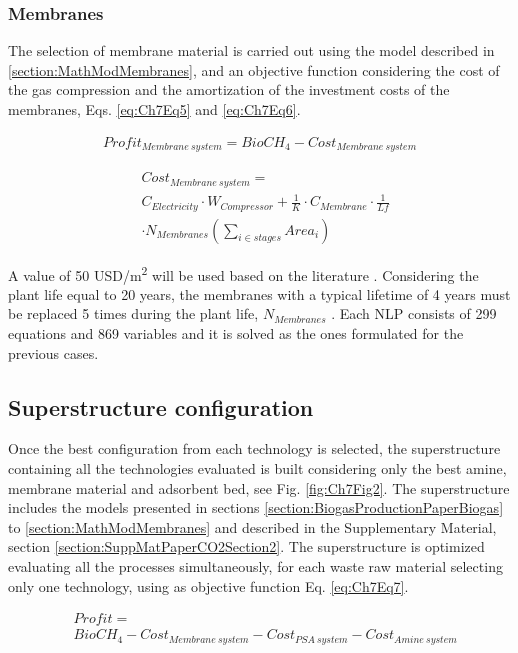 \begin{refsection}[referencesCh7]
\subsubsection{Membranes}
The selection of membrane material is carried out using the model described in \ref{section:MathModMembranes}, and an objective function considering the cost of the gas compression and the amortization of the investment costs of the membranes, Eqs. \ref{eq:Ch7Eq5} and \ref{eq:Ch7Eq6}.

\begin{align}
Profit_{Membrane \ system} = BioCH_{4}- Cost_{{Membrane \ system}} \label{eq:Ch7Eq5}
\end{align}

\begin{align}
& Cost_{{Membrane \ system}} = \label{eq:Ch7Eq6} \\
& {C}_{Electricity} \cdot W_{Compressor} + \frac{1}{K} \cdot C_{Membrane} \cdot \frac{1}{Lf} \nonumber \\
& \cdot N_{Membranes} \left(\sum\limits_{i \in stages} {Area_i}\right) \nonumber
\end{align}

A value of 50 USD/m\textsuperscript{2} will be used based on the literature \citep{kim2017optimization}. Considering the plant life equal to 20 years, the membranes with a typical lifetime of 4 years must be replaced 5 times during the plant life, $N_{Membranes}$ \citep{scholz2015structural}. Each NLP consists of 299 equations and 869 variables and it is solved as the ones formulated for the previous cases.

\subsection{Superstructure configuration}\label{section:SuperstructureConfiguration}
Once the best configuration from each technology is selected, the superstructure containing all the technologies evaluated is built considering only the best amine, membrane material and adsorbent bed, see Fig. \ref{fig:Ch7Fig2}. The superstructure includes the models presented in sections \ref{section:BiogasProductionPaperBiogas} to \ref{section:MathModMembranes} and described in the Supplementary Material, section \ref{section:SuppMatPaperCO2Section2}. The superstructure is optimized evaluating all the processes simultaneously, for each waste raw material selecting only one technology, using as objective function Eq. \ref{eq:Ch7Eq7}.

\begin{align}
& Profit = \label{eq:Ch7Eq7}  \\
& BioCH_{4} - Cost_{{Membrane \ system}} - Cost_{{PSA \ system}} - Cost_{{Amine \ system}} \nonumber
\end{align}


\end{refsection}
